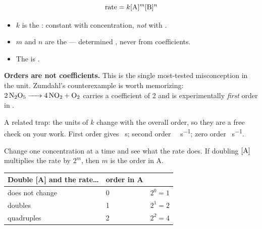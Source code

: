 \documentclass{apchem-notes}
\begin{document}


\[ \text{rate} = k[\ce{A}]^m[\ce{B}]^n \]

\begin{itemize}[leftmargin=*,itemsep=0.3em]
  \item $k$ is the : constant with concentration,
        \emph{not} with .
  \item $m$ and $n$ are the  --- determined
        , never from coefficients.
  \item The  is .
\end{itemize}

\begin{apctrap}
\textbf{Orders are not coefficients.} This is the single most-tested
misconception in the unit. Zumdahl's counterexample is worth memorizing:
$\ce{2N2O5 -> 4NO2 + O2}$ carries a coefficient of 2 and is experimentally
\emph{first} order in .

A related trap: the units of $k$ change with the overall order, so they are
a free check on your work. First order gives
\si{\per\second}; second order \si{\per\Molar\per\second}; zero order
\si{\Molar\per\second}.
\end{apctrap}


Change one concentration at a time and see what the rate does. If doubling
$[\ce{A}]$ multiplies the rate by $2^m$, then $m$ is the order in A.

\begin{center}
\begin{tabular}{@{}lll@{}}
\hline
\textbf{Double [A] and the rate\dots} & \textbf{order in A} & \\
\hline
does not change & 0 & $2^0 = 1$ \\
doubles & 1 & $2^1 = 2$ \\
quadruples & 2 & $2^2 = 4$ \\
\hline
\end{tabular}
\end{center}
\end{document}
